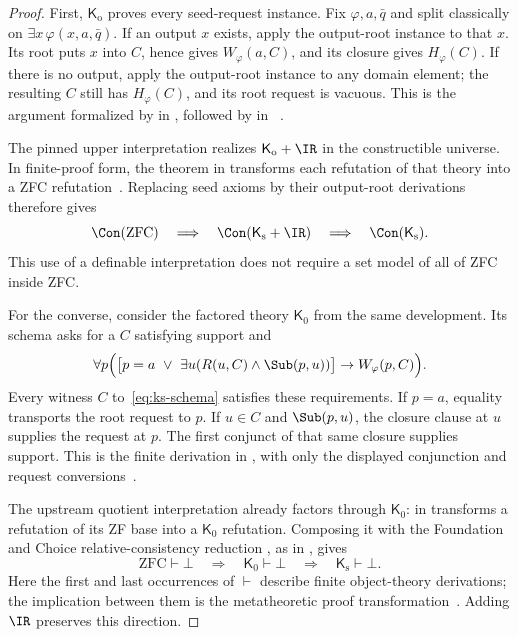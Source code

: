 \begin{proof}
First, $\mathsf K_{\mathrm o}$ proves every seed-request instance.  Fix
$\varphi,a,\bar q$ and split classically on
$\exists x\,\varphi(x,a,\bar q)$.  If an output $x$ exists, apply the
output-root instance to that $x$.  Its root puts $x$ into $C$, hence gives
$W_\varphi(a,C)$, and its closure gives $H_\varphi(C)$.  If there is no
output, apply the output-root instance to any domain element; the
resulting $C$ still has $H_\varphi(C)$, and its root request is vacuous.
This is the argument formalized by  in
, followed by  in
~\cite{kpseed,kprimecore}.

The pinned upper interpretation realizes $\mathsf K_{\mathrm o}+\IR$
in the constructible universe.  In finite-proof form, the theorem
 in
 transforms each refutation of that theory
into a ZFC refutation~\cite{k230}.  Replacing seed axioms by their
output-root derivations therefore gives
\[
 \Con(\mathrm{ZFC})\quad\Longrightarrow\quad
 \Con(\mathsf K_{\mathrm s}+\IR)\quad\Longrightarrow\quad
 \Con(\mathsf K_{\mathrm s}).
\]
This use of a definable interpretation does not require a set model of
all of ZFC inside ZFC.

For the converse, consider the factored theory $\mathsf K_0$ from the
same development.  Its schema asks for a $C$ satisfying support and
\begin{equation}
 \forall p\Bigl(
   \bigl[p=a\ \lor\ \exists u(R(u,C)\land\Sub(p,u))\bigr]
       \to W_\varphi(p,C)\Bigr).
 \label{eq:ks-k0-request}
\end{equation}
Every witness $C$ to~\eqref{eq:ks-schema} satisfies these requirements.
If $p=a$, equality transports the root request to $p$.  If
$u\in C$ and $\Sub(p,u)$, the closure clause at $u$ supplies the request
at $p$.  The first conjunct of that same closure supplies support.
This is the finite derivation  in
, with only the displayed conjunction and request
conversions~\cite{kprimecore}.

The upstream quotient interpretation already factors through
$\mathsf K_0$:  in
 transforms a refutation of its ZF base into a
$\mathsf K_0$ refutation.  Composing it with the Foundation and Choice
relative-consistency reduction , as in
, gives
\[
 \mathrm{ZFC}\vdash\bot
 \quad\Longrightarrow\quad
 \mathsf K_0\vdash\bot
 \quad\Longrightarrow\quad
 \mathsf K_{\mathrm s}\vdash\bot.
\]
Here the first and last occurrences of $\vdash$ describe finite
object-theory derivations; the implication between them is the
metatheoretic proof transformation~\cite{kquot}.
Adding $\IR$ preserves this direction.


\end{proof}
